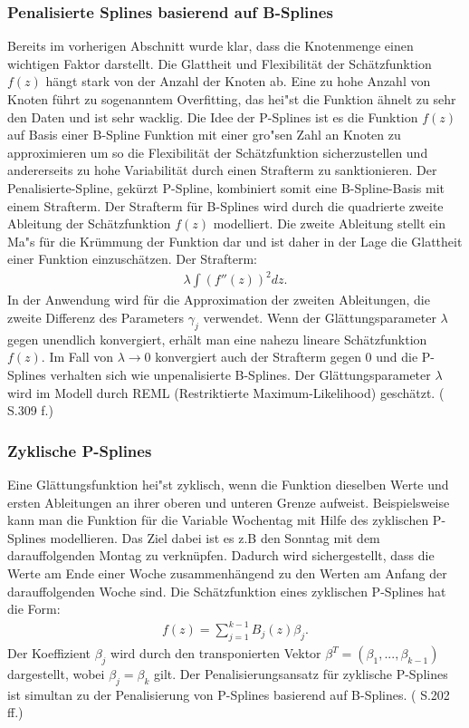 \documentclass[12pt]{scrreprt}
\begin{document}
\subsubsection{Penalisierte Splines basierend auf B-Splines}
Bereits im vorherigen Abschnitt wurde klar, dass die Knotenmenge einen wichtigen Faktor darstellt. Die Glattheit und Flexibilität der Schätzfunktion $f(z)$ hängt stark von der Anzahl der Knoten ab. Eine zu hohe Anzahl von Knoten führt zu sogenanntem \glqq Overfitting\grqq, das hei"st die Funktion ähnelt zu sehr den Daten und ist sehr wacklig. Die Idee der P-Splines ist es die Funktion $f(z)$ auf Basis einer B-Spline Funktion mit einer gro"sen Zahl an Knoten zu approximieren um so die Flexibilität der Schätzfunktion sicherzustellen und andererseits zu hohe Variabilität durch einen Strafterm zu sanktionieren. Der Penalisierte-Spline, gekürzt P-Spline, kombiniert somit eine B-Spline-Basis mit einem Strafterm. Der Strafterm für B-Splines wird durch die quadrierte zweite Ableitung der Schätzfunktion $f(z)$ modelliert. Die zweite Ableitung stellt ein Ma"s für die Krümmung der Funktion dar und ist daher in der Lage die Glattheit einer Funktion einzuschätzen.
Der Strafterm: 
\begin{align}
\lambda\int(f''(z))^2dz.
\end{align}
In der Anwendung wird für die Approximation der zweiten Ableitungen, die zweite Differenz des Parameters $\gamma_{j}$ verwendet. Wenn der Glättungsparameter $\lambda$ gegen unendlich konvergiert, erhält man eine nahezu lineare Schätzfunktion $f(z)$. Im Fall von $\lambda \to 0$ konvergiert auch der Strafterm gegen $0$ und die P-Splines verhalten sich wie unpenalisierte B-Splines. Der Glättungsparameter $\lambda$ wird im Modell durch REML (Restriktierte Maximum-Likelihood) geschätzt. (\cite{fahrmeir2007regression} S.309 f.)

\subsubsection{Zyklische P-Splines}
Eine Glättungsfunktion hei"st zyklisch, wenn die Funktion dieselben Werte und ersten Ableitungen an ihrer oberen und unteren Grenze aufweist. Beispielsweise kann man die Funktion für die Variable Wochentag mit Hilfe des zyklischen P-Splines modellieren. Das Ziel dabei ist es z.B den Sonntag mit dem darauffolgenden Montag zu verknüpfen. Dadurch wird sichergestellt, dass die Werte am Ende einer Woche zusammenhängend zu den Werten am Anfang der darauffolgenden Woche sind. 
Die Schätzfunktion eines zyklischen P-Splines hat die Form:
\begin{align}
f(z)=\sum_{j=1}^{k-1}B_{j}(z)\beta_{j}.
\end{align}
Der Koeffizient $\beta_{j}$ wird durch den transponierten Vektor $\beta^T=(\beta_{1},...,\beta_{k-1})$ dargestellt, wobei $\beta_{j}=\beta_{k}$ gilt.
Der Penalisierungsansatz für zyklische P-Splines ist simultan zu der Penalisierung von P-Splines basierend auf B-Splines. (\cite{wood2017generalized} S.202 ff.)
\end{document}
